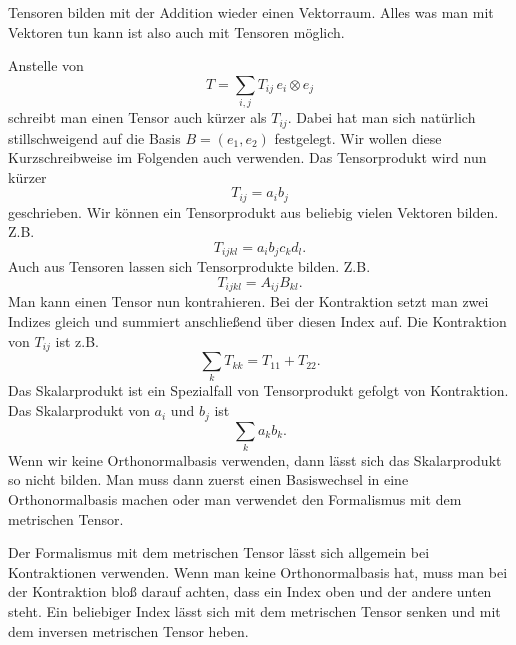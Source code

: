 \documentclass[a4paper,10pt,fleqn,twocolumn,twoside]{article}
\begin{document}
Tensoren bilden mit der Addition wieder einen Vektorraum.
Alles was man mit Vektoren tun kann ist also auch mit Tensoren
möglich.

Anstelle von
\[T = \sum_{i,j} T_{ij}\,e_i\otimes e_j\]
schreibt man einen Tensor auch kürzer als \(T_{ij}\).
Dabei hat man sich natürlich stillschweigend auf die
Basis \(B=(e_1,e_2)\) festgelegt.
Wir wollen diese Kurzschreibweise im Folgenden auch verwenden.
Das Tensorprodukt wird nun kürzer
\[T_{ij} = a_ib_j\]
geschrieben. Wir können ein Tensorprodukt aus beliebig vielen
Vektoren bilden. Z.B.
\[T_{ijkl} = a_ib_jc_kd_l.\]
Auch aus Tensoren lassen sich Tensorprodukte bilden. Z.B.
\[T_{ijkl} = A_{ij}B_{kl}.\]
Man kann einen Tensor nun kontrahieren.
Bei der Kontraktion setzt man zwei Indizes gleich und summiert
anschließend über diesen Index auf. Die Kontraktion von \(T_{ij}\)
ist z.B.
\[\sum_{k} T_{kk} = T_{11}+T_{22}.\]
Das Skalarprodukt ist ein Spezialfall von Tensorprodukt gefolgt von
Kontraktion. Das Skalarprodukt von \(a_i\) und \(b_j\) ist
\[\sum_{k} a_kb_k.\]
Wenn wir keine Orthonormalbasis verwenden, dann lässt sich das
Skalarprodukt so nicht bilden. Man muss dann zuerst einen
Basiswechsel in eine Orthonormalbasis machen oder man verwendet
den Formalismus mit dem metrischen Tensor.

Der Formalismus mit dem metrischen Tensor lässt sich allgemein
bei Kontraktionen verwenden. Wenn man keine Orthonormalbasis hat,
muss man bei der Kontraktion bloß darauf achten, dass ein Index
oben und der andere unten steht. Ein beliebiger Index lässt sich
mit dem metrischen Tensor senken und mit dem inversen metrischen
Tensor heben.
\end{document}
